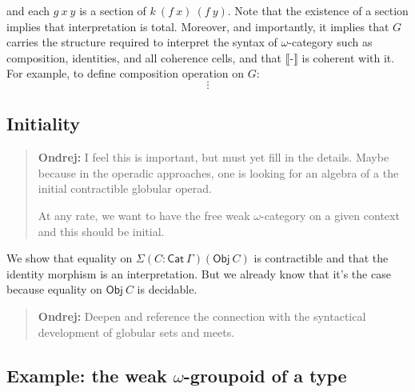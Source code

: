 \documentclass[a4paper]{article}
\newcommand{\mnote}[1]{\marginpar{\footnotesize{#1}}}
\newcommand{\Nat}{\mathbb{N}}
\newcommand{\Cat}{\mathsf{Cat}}
\newcommand{\Obj}{\mathsf{Obj}}
\newcommand{\domrm}{\mathrm{dom}}
\newcommand{\codrm}{\mathrm{cod}}
\newcommand{\meets}{\between}
\newcommand{\intpr}[1]{\llbracket #1 \rrbracket}
\newenvironment{ondrej}{\begin{quote}\footnotesize \textbf{Ondrej:}}{\normalsize\end{quote}}
\begin{document}
and each $g~x~y$ is a section of $k~(f~x)~(f~y)$. 
%
Note that the existence of a section implies that interpretation is
total. Moreover, and importantly, it implies that $G$ carries the
structure required to interpret the syntax of $\omega$-category such
as composition, identities, and all coherence cells, and that
$\intpr{\text{-}}$ is coherent with it. 
For example, to define composition
operation on $G$:
\[\vdots\]

\subsection{Initiality}
\begin{ondrej}
  I feel this is important, but must yet fill in the details. Maybe
  because in the operadic approaches, one is looking for an
  algebra of a the initial contractible globular operad. 

  At any rate, we want to have the free weak $\omega$-category on a
  given context and this should be initial.
\end{ondrej}
%
We show that equality on $\Sigma(C : \Cat~\Gamma) (\Obj~C)$ is
contractible and that the identity morphism is an interpretation.  But
we already know that it's the case because equality on $\Obj~C$ is
decidable.
%
\mnote{More detail is needed.}
%

\begin{ondrej}
  Deepen and reference the connection with the syntactical development
  of globular sets and meets.
\end{ondrej}

\subsection{Example: the weak $\omega$-groupoid of a type}
\end{document}
